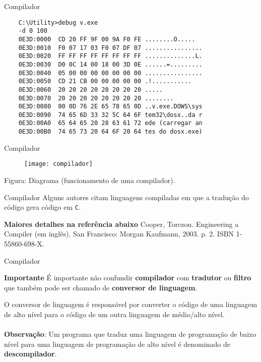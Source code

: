 \documentclass{beamer}
\begin{document}
\begin{frame}[fragile]{Compilador}
\begin{verbatim}
	C:\Utility>debug v.exe
	-d 0 100
	0E3D:0000  CD 20 FF 9F 00 9A F0 FE ........O.....
	0E3D:0010  F0 07 17 03 F0 07 DF 07 ................
	0E3D:0020  FF FF FF FF FF FF FF FF ..............L.
	0E3D:0030  D0 0C 14 00 18 00 3D 0E ......=.........
	0E3D:0040  05 00 00 00 00 00 00 00 ................
	0E3D:0050  CD 21 CB 00 00 00 00 00 .!...........
	0E3D:0060  20 20 20 20 20 20 20 20 .....
	0E3D:0070  20 20 20 20 20 20 20 20 ........
	0E3D:0080  00 0D 76 2E 65 78 65 0D ..v.exe.DOWS\sys
	0E3D:0090  74 65 6D 33 32 5C 64 6F tem32\dosx..da r
	0E3D:00A0  65 64 65 20 28 63 61 72 ede (carregar an
	0E3D:00B0  74 65 73 20 64 6F 20 64 tes do dosx.exe)
\end{verbatim}
\end{frame}


\begin{frame}{Compilador}
\begin{figure}
\centering
\texttt{[image: compilador]}
\end{figure}
\hspace{1cm}Figura: Diagrama (funcionamento de uma compilador).
\end{frame}

\begin{frame}{Compilador}	
Alguns autores citam linguagens compiladas em que a tradução do código gera código em \texttt{C}.\vspace{0.5cm}
\begin{block}{\textbf{Maiores detalhes na referência abaixo}}
Cooper, Torczon. Engineering a Compiler (em inglês). San Francisco: Morgan Kaufmann, 2003. p. 2. ISBN 1-55860-698-X.
\end{block}
\end{frame}

\begin{frame}{Compilador}
\begin{block}{\textbf{Importante}}
É importante não confundir \textbf{compilador} com \textbf{tradutor} ou \textbf{filtro} que também pode ser chamado de \textbf{conversor de linguagem}.
\end{block}
\vspace{0.3cm}
O conversor de linguagem é responsável por converter o código de uma linguagem de alto nível para o código de um outra linguagem de médio/alto nível.\\~\\

\textbf{Observação}: Um programa que traduz uma linguagem de programação de baixo nível para uma linguagem de programação de alto nível é denominado de \textbf{descompilador}.
\end{frame}
\end{document}
